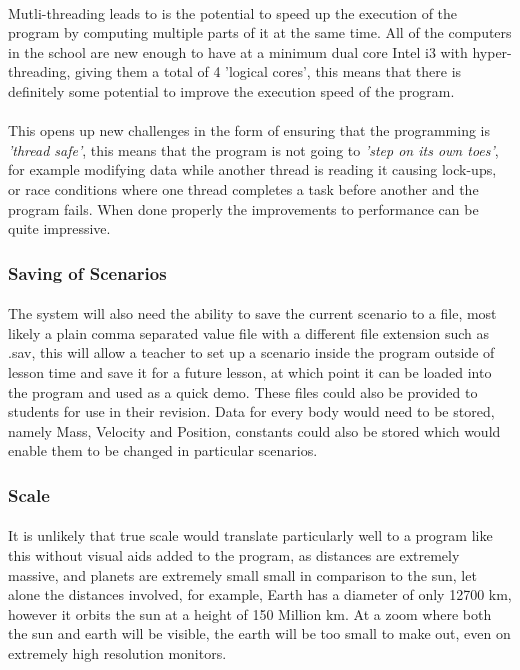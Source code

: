 \paragraph{}
Mutli-threading leads to is the potential to speed up the execution of the program by computing multiple parts of it at the same time. All of the computers in the school are new enough to have at a minimum dual core Intel i3 with hyper-threading, giving them a total of 4 'logical cores', this means that there is definitely some potential to improve the execution speed of the program.

\paragraph{} 
This opens up new challenges in the form of ensuring that the programming is \textit{'thread safe'}, this means that the program is not going to \textit{'step on its own toes'}, for example modifying data while another thread is reading it causing lock-ups, or race conditions where one thread completes a task before another and the program fails. When done properly the improvements to performance can be quite impressive.

\subsubsection{Saving of Scenarios}

\paragraph{}
The system will also need the ability to save the current scenario to a file, most likely a plain comma separated value file with a different file extension such as .sav, this will allow a teacher to set up a scenario inside the program outside of lesson time and save it for a future lesson, at which point it can be loaded into the program and used as a quick demo. These files could also be provided to students for use in their revision. Data for every body would need to be stored, namely Mass, Velocity and Position, constants could also be stored which would enable them to be changed in particular scenarios.

\subsubsection{Scale}

\paragraph{}
It is unlikely that true scale would translate particularly well to a program like this without visual aids added to the program, as distances are extremely massive, and planets are extremely small small in comparison to the sun, let alone the distances involved, for example, Earth has a diameter of only 12700 km, however it orbits the sun at a height of 150 Million km. At a zoom where both the sun and earth will be visible, the earth will be too small to make out, even on extremely high resolution monitors.

